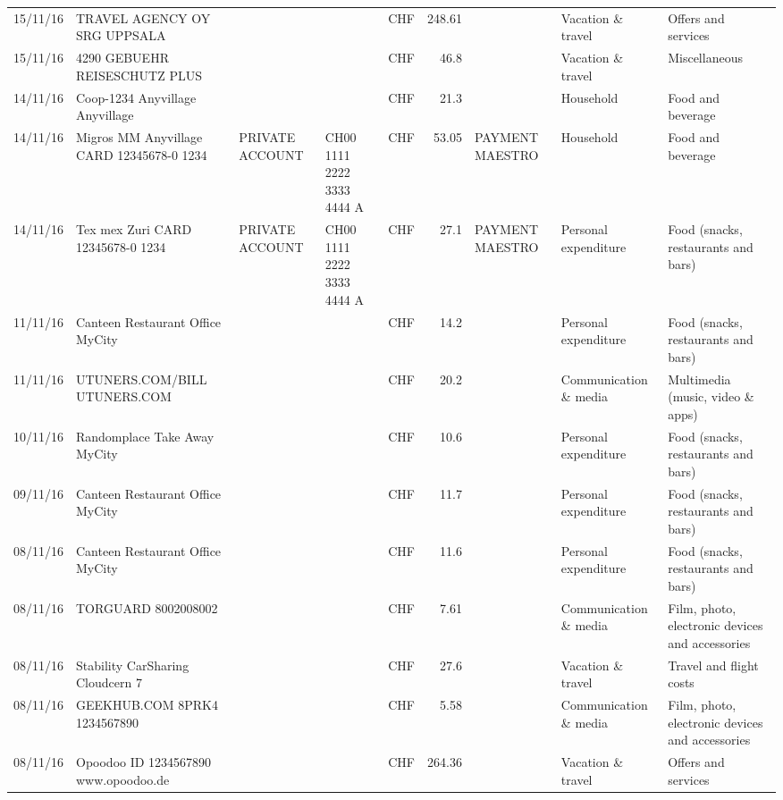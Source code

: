 \begin{landscape}
\begin{table}[h]
\begin{center}
\begin{tabular}{rllllrlll}
		15/11/16 & TRAVEL AGENCY OY SRG     UPPSALA &       &       & CHF   & 248.61 &       & Vacation \& travel & Offers and services \\
		15/11/16 & 4290 GEBUEHR REISESCHUTZ PLUS &       &       & CHF   & 46.8  &       & Vacation \& travel & Miscellaneous \\
		14/11/16 & Coop-1234 Anyvillage    Anyvillage &       &       & CHF   & 21.3  &       & Household & Food and beverage \\
		14/11/16 & Migros MM Anyvillage CARD 12345678-0 1234 & PRIVATE ACCOUNT & CH00 1111 2222 3333 4444 A & CHF   & 53.05 & PAYMENT MAESTRO & Household & Food and beverage \\
		14/11/16 & Tex mex Zuri CARD 12345678-0 1234 & PRIVATE ACCOUNT & CH00 1111 2222 3333 4444 A & CHF   & 27.1  & PAYMENT MAESTRO & Personal expenditure & Food (snacks, restaurants and bars) \\
		11/11/16 & Canteen Restaurant Office      MyCity &       &       & CHF   & 14.2  &       & Personal expenditure & Food (snacks, restaurants and bars) \\
		11/11/16 & UTUNERS.COM/BILL          UTUNERS.COM &       &       & CHF   & 20.2  &       & Communication \& media & Multimedia (music, video \& apps) \\
		10/11/16 & Randomplace Take Away     MyCity &       &       & CHF   & 10.6  &       & Personal expenditure & Food (snacks, restaurants and bars) \\
		09/11/16 & Canteen Restaurant Office      MyCity &       &       & CHF   & 11.7  &       & Personal expenditure & Food (snacks, restaurants and bars) \\
		08/11/16 & Canteen Restaurant Office      MyCity &       &       & CHF   & 11.6  &       & Personal expenditure & Food (snacks, restaurants and bars) \\
		08/11/16 & TORGUARD                 8002008002 &       &       & CHF   & 7.61  &       & Communication \& media & Film, photo, electronic devices and accessories \\
		08/11/16 & Stability CarSharing      Cloudcern 7 &       &       & CHF   & 27.6  &       & Vacation \& travel & Travel and flight costs \\
		08/11/16 & GEEKHUB.COM  8PRK4        1234567890 &       &       & CHF   & 5.58  &       & Communication \& media & Film, photo, electronic devices and accessories \\
		08/11/16 & Opoodoo ID 1234567890      www.opoodoo.de &       &       & CHF   & 264.36 &       & Vacation \& travel & Offers and services \\

\end{tabular}
\end{center}
\end{table}
\end{landscape}
